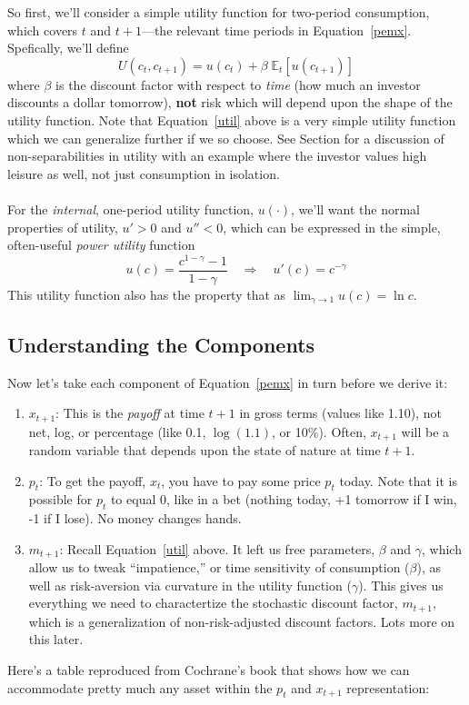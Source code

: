 \documentclass[12pt]{article}
\theoremstyle{plain}
\theoremstyle{definition}
\theoremstyle{remark}
\begin{document}
So first, we'll consider a simple utility function for two-period
consumption, which covers $t$ and $t+1$---the relevant time periods
in Equation~\ref{pemx}. Spefically, we'll define
\begin{equation}
    \label{util}
    U(c_t, c_{t+1}) = u(c_t) + \beta \;\mathbb{E}_t\left[u(c_{t+1})\right]
\end{equation}
where $\beta$ is the discount factor with respect to \emph{time} (how
much an investor discounts a dollar tomorrow), \textbf{not} risk which
will depend upon the shape of the utility function. Note that
Equation~\ref{util} above is a very simple utility function which we can
generalize further if we so choose. See Section for a discussion of
non-separabilities in utility with an example where the investor values
high leisure as well, not just consumption in isolation.
\\
\\
For the \emph{internal}, one-period utility function, $u(\cdot)$, we'll
want the normal properties of utility, $u'>0$ and $u''<0$, which can be
expressed in the simple, often-useful \emph{power utility} function
\begin{equation}
    \label{upwr}
    u(c) = \frac{c^{1-\gamma}-1}{1-\gamma} \quad\Rightarrow\quad
	u'(c) = c^{-\gamma}
\end{equation}
This utility function also has the property that as
$\lim_{\gamma\rightarrow 1}u(c) = \ln c$.

\subsection{Understanding the Components}

Now let's take each component of Equation~\ref{pemx} in turn
before we derive it:
\begin{enumerate}
  \item $x_{t+1}$: This is the \emph{payoff} at time $t+1$ in gross
    terms (values like 1.10), not net, log, or percentage (like 0.1,
    $\log(1.1)$, or 10\%).  Often, $x_{t+1}$ will be a random variable
    that depends upon the state of nature at time $t+1$.

  \item $p_t$: To get the payoff, $x_t$, you have to pay some price
    $p_t$ today. Note that it is possible for $p_t$ to equal 0, like in
    a bet (nothing today, +1 tomorrow if I win, -1 if I lose).  No money
    changes hands.

  \item $m_{t+1}$: Recall Equation~\ref{util} above.  It left us free
    parameters, $\beta$ and $\gamma$, which allow us to tweak
    ``impatience,'' or time sensitivity of consumption ($\beta$), as
    well as risk-aversion via curvature in the utility function
    ($\gamma$).  This gives us everything we need to charactertize the
    stochastic discount factor, $m_{t+1}$, which is a generalization of
    non-risk-adjusted discount factors. Lots more on this later.
\end{enumerate}
Here's a table reproduced from Cochrane's book that shows how we can
accommodate pretty much any asset within the $p_t$ and $x_{t+1}$
representation:
\end{document}
